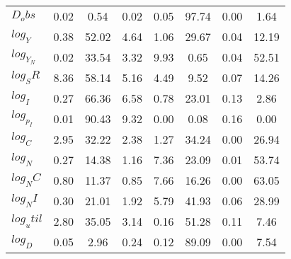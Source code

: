 \begin{center}
\begin{longtable}{lccccccc}
$D_obs     $	 & 	        0.02	 & 	        0.54	 & 	        0.02	 & 	        0.05	 & 	       97.74	 & 	        0.00	 & 	        1.64 \\ 
$log_Y     $	 & 	        0.38	 & 	       52.02	 & 	        4.64	 & 	        1.06	 & 	       29.67	 & 	        0.04	 & 	       12.19 \\ 
$log_Y_N   $	 & 	        0.02	 & 	       33.54	 & 	        3.32	 & 	        9.93	 & 	        0.65	 & 	        0.04	 & 	       52.51 \\ 
$log_SR    $	 & 	        8.36	 & 	       58.14	 & 	        5.16	 & 	        4.49	 & 	        9.52	 & 	        0.07	 & 	       14.26 \\ 
$log_I     $	 & 	        0.27	 & 	       66.36	 & 	        6.58	 & 	        0.78	 & 	       23.01	 & 	        0.13	 & 	        2.86 \\ 
$log_p_I   $	 & 	        0.01	 & 	       90.43	 & 	        9.32	 & 	        0.00	 & 	        0.08	 & 	        0.16	 & 	        0.00 \\ 
$log_C     $	 & 	        2.95	 & 	       32.22	 & 	        2.38	 & 	        1.27	 & 	       34.24	 & 	        0.00	 & 	       26.94 \\ 
$log_N     $	 & 	        0.27	 & 	       14.38	 & 	        1.16	 & 	        7.36	 & 	       23.09	 & 	        0.01	 & 	       53.74 \\ 
$log_NC    $	 & 	        0.80	 & 	       11.37	 & 	        0.85	 & 	        7.66	 & 	       16.26	 & 	        0.00	 & 	       63.05 \\ 
$log_NI    $	 & 	        0.30	 & 	       21.01	 & 	        1.92	 & 	        5.79	 & 	       41.93	 & 	        0.06	 & 	       28.99 \\ 
$log_util  $	 & 	        2.80	 & 	       35.05	 & 	        3.14	 & 	        0.16	 & 	       51.28	 & 	        0.11	 & 	        7.46 \\ 
$log_D     $	 & 	        0.05	 & 	        2.96	 & 	        0.24	 & 	        0.12	 & 	       89.09	 & 	        0.00	 & 	        7.54 \\ 
\end{longtable}
 \end{center}
